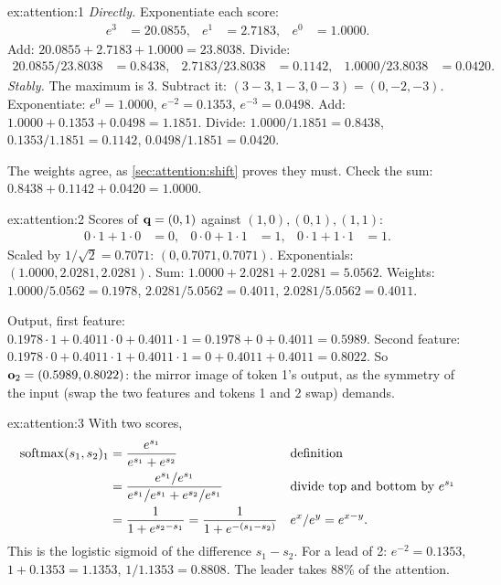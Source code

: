 
\begin{solution}{ex:attention:1}
\emph{Directly.} Exponentiate each score:
\begin{align*}
  e^{3} &= 20.0855, & e^{1} &= 2.7183, & e^{0} &= 1.0000.
\end{align*}
Add: $20.0855 + 2.7183 + 1.0000 = 23.8038$. Divide:
\begin{align*}
  20.0855/23.8038 &= 0.8438, & 2.7183/23.8038 &= 0.1142, & 1.0000/23.8038 &= 0.0420.
\end{align*}
\emph{Stably.} The maximum is 3. Subtract it: $(3-3, 1-3, 0-3) = (0, -2, -3)$. Exponentiate:
$e^{0} = 1.0000$, $e^{-2} = 0.1353$, $e^{-3} = 0.0498$. Add: $1.0000 + 0.1353 + 0.0498 = 1.1851$.
Divide: $1.0000/1.1851 = 0.8438$, $0.1353/1.1851 = 0.1142$, $0.0498/1.1851 = 0.0420$.

The weights agree, as \cref{sec:attention:shift} proves they must. Check the sum:
$0.8438 + 0.1142 + 0.0420 = 1.0000$.
\end{solution}

\begin{solution}{ex:attention:2}
Scores of $\mathbf{q} = (0,1)$ against $(1,0), (0,1), (1,1)$:
\begin{align*}
  0\cdot1 + 1\cdot0 &= 0, & 0\cdot0 + 1\cdot1 &= 1, & 0\cdot1 + 1\cdot1 &= 1.
\end{align*}
Scaled by $1/\sqrt2 = 0.7071$: $(0, 0.7071, 0.7071)$. Exponentials: $(1.0000, 2.0281, 2.0281)$.
Sum: $1.0000 + 2.0281 + 2.0281 = 5.0562$. Weights: $1.0000/5.0562 = 0.1978$,
$2.0281/5.0562 = 0.4011$, $2.0281/5.0562 = 0.4011$.

Output, first feature: $0.1978\cdot1 + 0.4011\cdot0 + 0.4011\cdot1 = 0.1978 + 0 + 0.4011 = 0.5989$.
Second feature: $0.1978\cdot0 + 0.4011\cdot1 + 0.4011\cdot1 = 0 + 0.4011 + 0.4011 = 0.8022$.
So $\mathbf{o}_2 = (0.5989, 0.8022)$: the mirror image of token 1's output, as the symmetry of the
input (swap the two features and tokens 1 and 2 swap) demands.
\end{solution}

\begin{solution}{ex:attention:3}
With two scores,
\begin{align*}
  \operatorname{softmax}(s_1, s_2)_1 &= \frac{e^{s_1}}{e^{s_1} + e^{s_2}} && \text{definition}\\
  &= \frac{e^{s_1}/e^{s_1}}{e^{s_1}/e^{s_1} + e^{s_2}/e^{s_1}} && \text{divide top and bottom by } e^{s_1}\\
  &= \frac{1}{1 + e^{s_2 - s_1}} = \frac{1}{1 + e^{-(s_1 - s_2)}} && e^{x}/e^{y} = e^{x-y}.
\end{align*}
This is the logistic sigmoid of the difference $s_1 - s_2$. For a lead of 2: $e^{-2} = 0.1353$,
$1 + 0.1353 = 1.1353$, $1/1.1353 = 0.8808$. The leader takes 88\% of the attention.
\end{solution}

